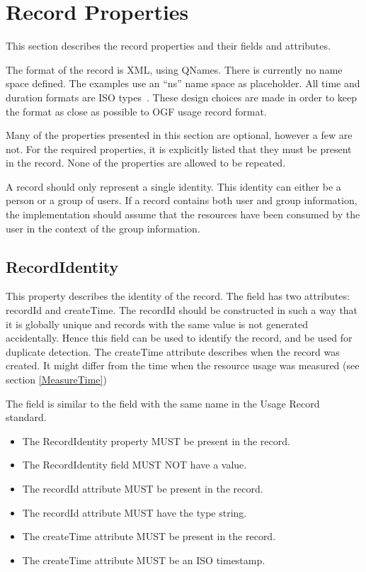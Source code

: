 \section{Record Properties}

This section describes the record properties and their fields and attributes.

The format of the record is XML, using QNames. There is currently no name space
defined. The examples use an ``ns'' name space as placeholder. All time and
duration formats are ISO types~\cite{iso8601}. These design choices are made in
order to keep the format as close as possible to OGF usage record format.

Many of the properties presented in this section are optional, however a few
are not. For the required properties, it is explicitly listed that they must
be present in the record. None of the properties are allowed to be repeated.

A record should only represent a single identity. This identity can either be a
person or a group of users. If a record contains both user and group
information, the implementation should assume that the resources have been
consumed by the user in the context of the group information.




\subsection{RecordIdentity}

This property describes the identity of the record. The field has two
attributes: recordId and createTime. The recordId should be constructed in such
a way that it is globally unique and records with the same value is not
generated accidentally. Hence this field can be used to identify the record,
and be used for duplicate detection. The createTime attribute describes when the
record was created. It might differ from the time when the resource usage
was measured (see section \ref{MeasureTime})

The field is similar to the field with the same name in the Usage Record
standard.

\begin{itemize}
\item The RecordIdentity property MUST be present in the record.
\item The RecordIdentity field MUST NOT have a value.
\item The recordId attribute MUST be present in the record.
\item The recordId attribute MUST have the type string.
\item The createTime attribute MUST be present in the record.
\item The createTime attribute MUST be an ISO timestamp.
\end{itemize}

